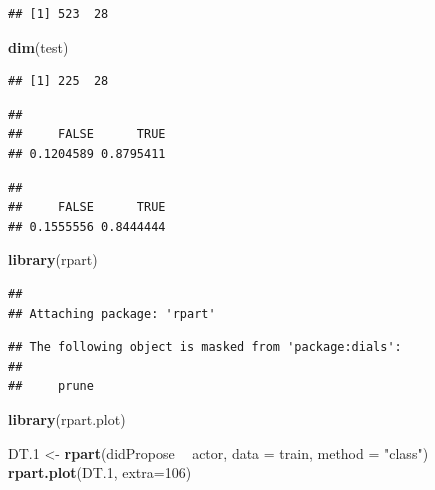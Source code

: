 \documentclass[]{article}
\newenvironment{Shaded}{\begin{snugshade}}{\end{snugshade}}
\newcommand{\DataTypeTok}[1]{\textcolor[rgb]{0.13,0.29,0.53}{#1}}
\newcommand{\DecValTok}[1]{\textcolor[rgb]{0.00,0.00,0.81}{#1}}
\newcommand{\FloatTok}[1]{\textcolor[rgb]{0.00,0.00,0.81}{#1}}
\newcommand{\KeywordTok}[1]{\textcolor[rgb]{0.13,0.29,0.53}{\textbf{#1}}}
\newcommand{\NormalTok}[1]{#1}
\newcommand{\OperatorTok}[1]{\textcolor[rgb]{0.81,0.36,0.00}{\textbf{#1}}}
\newcommand{\StringTok}[1]{\textcolor[rgb]{0.31,0.60,0.02}{#1}}
\begin{document}
\begin{verbatim}
## [1] 523  28
\end{verbatim}

\begin{Shaded}
\begin{Highlighting}[]
\KeywordTok{dim}\NormalTok{(test)}
\end{Highlighting}
\end{Shaded}

\begin{verbatim}
## [1] 225  28
\end{verbatim}

\begin{Shaded}
\end{Shaded}

\begin{verbatim}
## 
##     FALSE      TRUE 
## 0.1204589 0.8795411
\end{verbatim}

\begin{Shaded}
\end{Shaded}

\begin{verbatim}
## 
##     FALSE      TRUE 
## 0.1555556 0.8444444
\end{verbatim}

\begin{Shaded}
\begin{Highlighting}[]
\KeywordTok{library}\NormalTok{(rpart)}
\end{Highlighting}
\end{Shaded}

\begin{verbatim}
## 
## Attaching package: 'rpart'
\end{verbatim}

\begin{verbatim}
## The following object is masked from 'package:dials':
## 
##     prune
\end{verbatim}

\begin{Shaded}
\begin{Highlighting}[]
\KeywordTok{library}\NormalTok{(rpart.plot)}

\NormalTok{DT}\FloatTok{.1}\NormalTok{ <-}\StringTok{ }\KeywordTok{rpart}\NormalTok{(didPropose }\OperatorTok{~}\StringTok{ }\NormalTok{actor, }\DataTypeTok{data =}\NormalTok{ train, }\DataTypeTok{method =} \StringTok{"class"}\NormalTok{)}
\KeywordTok{rpart.plot}\NormalTok{(DT}\FloatTok{.1}\NormalTok{, }\DataTypeTok{extra=}\DecValTok{106}\NormalTok{)}
\end{Highlighting}
\end{Shaded}
\end{document}
